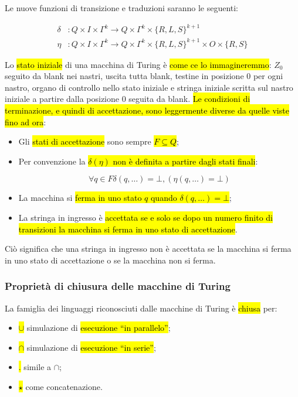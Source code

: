 \documentclass[a4paper,11pt,twoside]{article}
\theoremstyle{plain}
\theoremstyle{definition}
\theoremstyle{remark}
\begin{document}
Le nuove funzioni di transizione e traduzioni saranno le seguenti:

\begin{align}
  \delta&: Q \times I \times \Gamma^k \to
    Q \times \Gamma^k \times {\{R,L,S\}}^{k+1} \\
  \eta&: Q \times I \times \Gamma^k \to
    Q \times \Gamma^k \times {\{R,L,S\}}^{k+1} \times O \times \{R,S\}
\end{align}

Lo \hl{stato iniziale} di una macchina di Turing è \hl{come ce lo
immagineremmo}: $Z_0$ seguito da blank nei nastri, uscita tutta blank, testine
in posizione 0 per ogni nastro, organo di controllo nello stato iniziale e
stringa iniziale scritta sul nastro iniziale a partire dalla posizione 0 seguita
da blank. \hl{Le condizioni di terminazione, e quindi di accettazione, sono
leggermente diverse da quelle viste fino ad ora}:

\begin{itemize}
  \item Gli \hl{stati di accettazione} sono sempre \hl{$F \subseteq Q$};
  \item Per convenzione la \hl{$\delta (\eta)$ non è definita a partire dagli
    stati finali}:

    \begin{equation}
      \forall q \in F \delta(q, \ldots) = \bot, (\eta (q, \ldots) = \bot)
    \end{equation}

  \item La macchina si \hl{ferma in uno stato $q$ quando
    $\delta(q, \ldots) = \bot$};
  \item La stringa in ingresso è \hl{accettata se e solo se dopo un numero
    finito di transizioni la macchina si ferma in uno stato di accettazione}.
\end{itemize}

Ciò significa che una stringa in ingresso non è accettata se la macchina si
ferma in uno stato di accettazione o se la macchina non si ferma.

\subsubsection{Proprietà di chiusura delle macchine di Turing}\label{sec:analisi-mt}

La famiglia dei linguaggi riconosciuti dalle macchine di Turing è \hl{chiusa}
per:

\begin{itemize}
  \item \hl{$\cup$} simulazione di \hl{esecuzione ``in parallelo''};
  \item \hl{$\cap$} simulazione di \hl{esecuzione ``in serie''};
  \item \hl{$ . $} simile a $\cap$;
  \item \hl{$\star$} come concatenazione.
\end{itemize}
\end{document}

